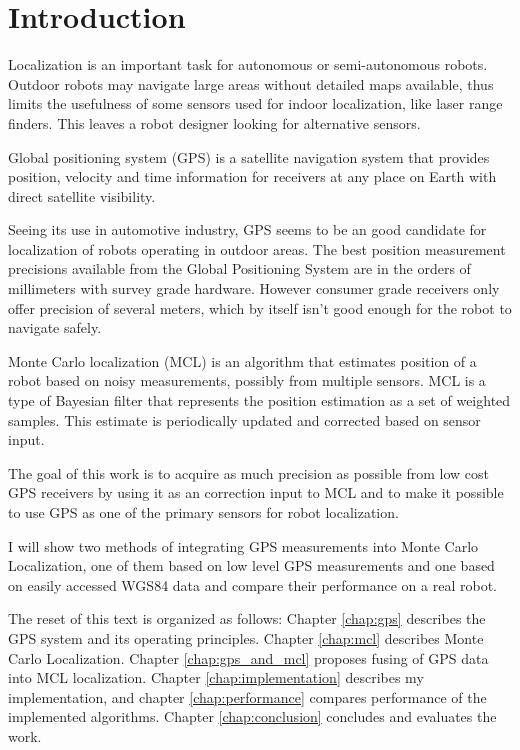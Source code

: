 \chapter{Introduction}

Localization is an important task for autonomous or semi-autonomous robots.
Outdoor robots may navigate large areas without detailed maps available, thus limits
the usefulness of some sensors used for indoor localization, like laser range finders.
This leaves a robot designer looking for alternative sensors.



Global positioning system (GPS) is a satellite navigation system that
provides position, velocity and time information for receivers at any place on Earth with direct
satellite visibility.

Seeing its use in automotive industry, GPS seems to be an good candidate for
localization of robots operating in outdoor areas.
The best position measurement precisions available from the Global Positioning System
are in the orders of millimeters with survey grade hardware.
However consumer grade receivers only offer precision of several meters, which
by itself isn't good enough for the robot to navigate safely.


Monte Carlo localization (MCL) is an algorithm that estimates position of a robot
based on noisy measurements, possibly from multiple sensors.
MCL is a type of Bayesian filter that represents the position estimation as a
set of weighted samples.
This estimate is periodically updated and corrected based on sensor input.


\vspace{1.5em}


The goal of this work is to acquire as much precision as possible from low cost
GPS receivers by using it as an correction input to MCL and to make it possible to use
GPS as one of the primary sensors for robot localization.

I will show two methods of integrating GPS measurements into Monte Carlo Localization,
one of them based on low level GPS measurements and one based on easily accessed WGS84 data
and compare their performance on a real robot.



The reset of this text is organized as follows:
Chapter \ref{chap:gps} describes the GPS system and its operating principles.
Chapter \ref{chap:mcl} describes Monte Carlo Localization.
Chapter \ref{chap:gps_and_mcl} proposes fusing of GPS data into MCL localization.
Chapter \ref{chap:implementation} describes my implementation,
and chapter \ref{chap:performance} compares performance of the implemented algorithms.
Chapter \ref{chap:conclusion} concludes and evaluates the work.
